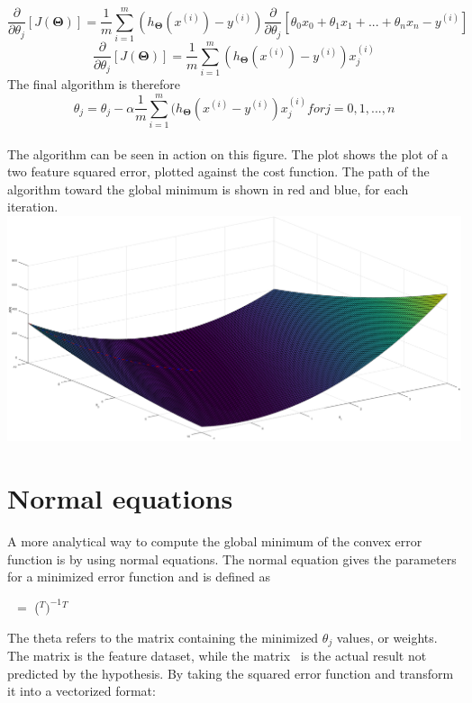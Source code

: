 \documentclass[a4paper,12pt]{article}
\begin{document}
\[\frac{\partial}{\partial\theta_j} [J(\boldsymbol{\Theta})] = \frac{1}{m} \sum_{i=1}^m (h_{\boldsymbol{\Theta}}(x^{(i)}) - y^{(i)})\frac{\partial}{\partial\theta_j} [\theta_0x_0+\theta_1x_1+...+\theta_nx_n-y^{(i)}]\]
\[\frac{\partial}{\partial\theta_j} [J(\boldsymbol{\Theta})] = \frac{1}{m} \sum_{i=1}^m (h_{\boldsymbol{\Theta}}(x^{(i)}) - y^{(i)})x_j^{(i)}\]
The final algorithm is therefore
\[\theta_j = \theta_j - \alpha \frac{1}{m} \sum_{i=1}^m (h_{\boldsymbol{\Theta}}(x^{(i)} - y^{(i)})x_j^{(i)} for j = 0,1,...,n\]
\\
The algorithm can be seen in action on this figure. The plot shows the plot of a two feature squared error, plotted against the cost function. The path of the algorithm toward the global minimum is shown in red and blue, for each iteration. 
\\
\includegraphics[scale=0.38]{gradientdescent}
\\
\section{Normal equations}
A more analytical way to compute the global minimum of the convex error function is by using normal equations. The normal equation gives the parameters for a minimized error function and is defined as
\begin{center}
\boldmath{$\Theta $}\unboldmath \ $=$ (\unboldmath$^T$\unboldmath$)^{-1}$\unboldmath$^T$\unboldmath
\end{center}
The theta refers to the matrix containing the minimized \(\theta_j\) values, or weights. The matrix \unboldmath is the feature dataset, while the matrix \unboldmath \ is the actual result not predicted by the hypothesis. By taking the squared error function and transform it into a vectorized format:
\end{document}
